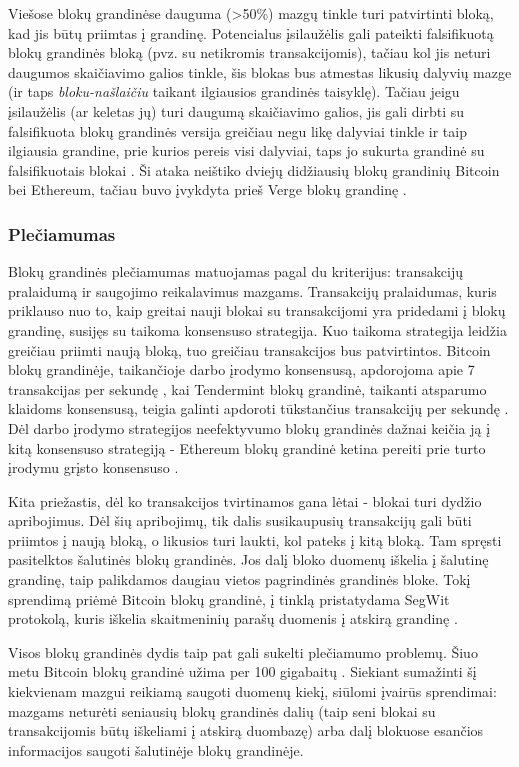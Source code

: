 Viešose blokų grandinėse dauguma (>50\%) mazgų tinkle turi patvirtinti bloką, kad jis būtų priimtas į grandinę. Potencialus įsilaužėlis gali pateikti
falsifikuotą blokų grandinės bloką (pvz. su netikromis transakcijomis), tačiau kol jis neturi daugumos skaičiavimo galios tinkle, šis blokas bus
atmestas likusių dalyvių mazge (ir taps \textit{bloku-našlaičiu} taikant ilgiausios grandinės taisyklę). Tačiau jeigu įsilaužėlis (ar keletas jų)
turi daugumą skaičiavimo galios, jis gali dirbti su falsifikuota blokų grandinės versija greičiau negu likę dalyviai tinkle ir taip ilgiausia grandine, prie kurios
pereis visi dalyviai, taps jo sukurta grandinė su falsifikuotais blokai \cite{Zheng2017}. Ši ataka neištiko dviejų didžiausių blokų grandinių Bitcoin bei Ethereum, tačiau
buvo įvykdyta prieš Verge blokų grandinę \cite{Sedgwick2018}.

\subsubsection{Plečiamumas}

Blokų grandinės plečiamumas matuojamas pagal du kriterijus: transakcijų pralaidumą ir saugojimo reikalavimus mazgams. Transakcijų pralaidumas, kuris priklauso nuo to,
kaip greitai nauji blokai su transakcijomi yra pridedami į blokų grandinę, susijęs su taikoma konsensuso strategija.
Kuo taikoma strategija leidžia greičiau priimti naują bloką, tuo greičiau transakcijos bus patvirtintos. Bitcoin blokų grandinėje, taikančioje darbo įrodymo konsensusą,
apdorojoma apie 7 transakcijas per sekundę \cite{Zheng2017}, kai Tendermint blokų grandinė, taikanti
atsparumo klaidoms konsensusą, teigia galinti apdoroti tūkstančius transakcijų per sekundę \cite{Tendermint2017}. Dėl darbo įrodymo strategijos neefektyvumo
blokų grandinės dažnai keičia ją į kitą konsensuso strategiją - Ethereum blokų grandinė ketina pereiti prie turto įrodymu grįsto konsensuso \cite{Ethereum}.

Kita priežastis, dėl ko transakcijos tvirtinamos gana lėtai - blokai turi dydžio apribojimus. Dėl šių apribojimų, tik dalis susikaupusių transakcijų gali būti priimtos
į naują bloką, o likusios turi laukti, kol pateks į kitą bloką. Tam spręsti pasitelktos šalutinės blokų grandinės. Jos dalį bloko duomenų iškelia į šalutinę grandinę,
taip palikdamos daugiau vietos pagrindinės grandinės bloke. Tokį sprendimą priėmė Bitcoin blokų grandinė, į tinklą pristatydama SegWit protokolą, kuris iškelia skaitmeninių
parašų duomenis į atskirą grandinę \cite{Segwit}.

Visos blokų grandinės dydis taip pat gali sukelti plečiamumo problemų. Šiuo metu Bitcoin blokų grandinė užima per 100 gigabaitų \cite{Zheng2017}. Siekiant sumažinti šį kiekvienam mazgui 
reikiamą saugoti duomenų kiekį,
siūlomi įvairūs sprendimai: mazgams neturėti seniausių blokų grandinės dalių (taip seni blokai su transakcijomis būtų iškeliami į atskirą duombazę)
arba dalį blokuose esančios informacijos saugoti šalutinėje blokų grandinėje. 

